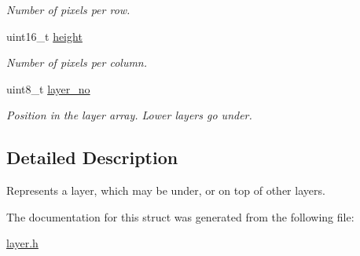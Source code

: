 \begin{DoxyCompactItemize}
\begin{DoxyCompactList}\small\item\em Number of pixels per row. \end{DoxyCompactList}\item 
uint16\+\_\+t \mbox{\hyperlink{group__layer_ga55165612a9f4da7933dde862c7a54406}{height}}
\begin{DoxyCompactList}\small\item\em Number of pixels per column. \end{DoxyCompactList}\item 
uint8\+\_\+t \mbox{\hyperlink{group__layer_ga0c56f7ad3a85bd2173f52e11176f791c}{layer\+\_\+no}}
\begin{DoxyCompactList}\small\item\em Position in the layer array. Lower layers go under. \end{DoxyCompactList}\end{DoxyCompactItemize}


\subsection{Detailed Description}
Represents a layer, which may be under, or on top of other layers. 

The documentation for this struct was generated from the following file\+:\begin{DoxyCompactItemize}
\item 
\mbox{\hyperlink{layer_8h}{layer.\+h}}\end{DoxyCompactItemize}
